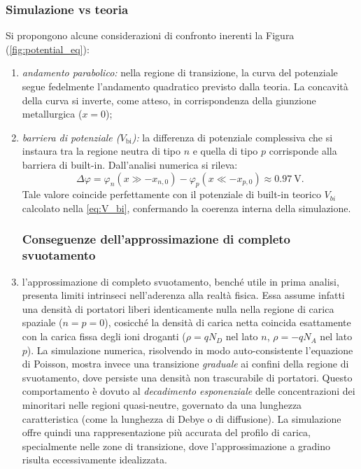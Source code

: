 \documentclass[a4paper,11pt]{report}
\begin{document}
\subsubsection{Simulazione vs teoria}
\label{sec_prova}
Si propongono alcune considerazioni di confronto inerenti la Figura (\ref{fig:potential_eq}):
\begin{enumerate}
    \item \textit{andamento parabolico:} nella regione di transizione, la curva del potenziale segue fedelmente l'andamento quadratico previsto dalla teoria. La concavità della curva si inverte, come atteso, in corrispondenza della giunzione metallurgica ($x=0$);

    \item \textit{barriera di potenziale ($V_{\text{bi}}$):} la differenza di potenziale complessiva che si instaura tra la regione neutra di tipo $n$ e quella di tipo $p$ corrisponde alla barriera di built-in.
    Dall'analisi numerica si rileva:
    \begin{equation}
        \Delta \varphi = \varphi_n(x \gg -x_{n,0}) - \varphi_p(x \ll -x_{p,0}) \approx \SI{0.97}{\volt}.
    \end{equation}
    Tale valore coincide perfettamente con il potenziale di built-in teorico $V_{bi}$ calcolato nella \eqref{eq:V_bi}, confermando la coerenza interna della simulazione.
   

\subsubsection{Conseguenze dell'approssimazione di completo svuotamento}
\label{sec:conseguenze_compl_svuot}
\item l'approssimazione di completo svuotamento, benché utile in prima analisi, presenta limiti intrinseci nell'aderenza alla realtà fisica. Essa assume infatti una densità di portatori liberi identicamente nulla nella regione di carica spaziale (\(n=p=0\)), cosicché la densità di carica netta coincida esattamente con la carica fissa degli ioni droganti (\(\rho = qN_D\) nel lato \(n\), \(\rho = -qN_A\) nel lato \(p\)).
La simulazione numerica, risolvendo in modo auto-consistente l'equazione di Poisson, mostra invece una transizione \textit{graduale} ai confini della regione di svuotamento, dove persiste una densità non trascurabile di portatori. Questo comportamento è dovuto al \textit{decadimento esponenziale} delle concentrazioni dei minoritari nelle regioni quasi-neutre, governato da una lunghezza caratteristica (come la lunghezza di Debye o di diffusione).
La simulazione offre quindi una rappresentazione più accurata del profilo di carica, specialmente nelle zone di transizione, dove l'approssimazione a gradino risulta eccessivamente idealizzata.
    \end{enumerate}
\end{document}

